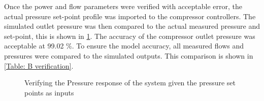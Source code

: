	Once the power and flow parameters were verified with acceptable error, the actual pressure set-point profile was imported to the compressor controllers. The simulated outlet pressure was then compared to the actual measured pressure and set-point, this is shown in \cref{fig: Verification Pressure kusasalethu Setpoint}. The accuracy of the compressor outlet pressure was acceptable at 99.02 \%. To ensure the model accuracy, all measured flows and pressures were compared to the simulated outputs. This comparison is shown in \cref{Table: B verification}.

	\begin{figure}[h]
		\centering
		
		\caption{Verifying the Pressure response of the system given the pressure set points as inputs}
		\label{fig: Verification Pressure kusasalethu Setpoint}
	\end{figure}


